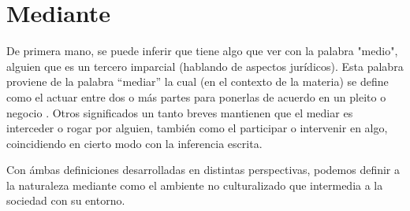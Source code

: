 \documentclass[stu, 12pt, letterpaper, donotrepeattitle, floatsintext, natbib]{apa7}
\begin{document}
\section{Mediante}
De \justifying primera mano, se puede inferir que tiene algo que ver con la palabra "medio", alguien que es un tercero imparcial (hablando de aspectos jurídicos). Esta palabra proviene de la palabra ``mediar'' la cual 
(en el contexto de la materia) se define como el actuar entre dos o más partes para ponerlas de acuerdo en un pleito o negocio \citep{-asale-2020}. 
Otros significados un tanto breves mantienen que el mediar es interceder o rogar por alguien, también como el participar o intervenir en algo, coincidiendo en cierto modo con la inferencia escrita.\par
\vspace{\baselineskip}
Con ámbas definiciones desarrolladas en distintas perspectivas, podemos definir a la naturaleza mediante como el ambiente no culturalizado que intermedia a la sociedad con su entorno.\par
\vspace{\baselineskip}
\newpage
\setcounter{secnumdepth}{0} %
\renewcommand\refname{\textbf{Referencias}}

\end{document}
